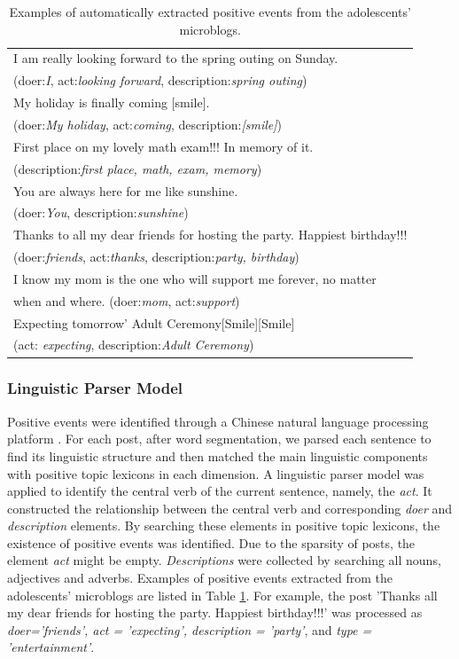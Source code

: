 \begin{table}[h]
\begin{center}
\caption{\small{Examples of automatically extracted positive events from the adolescents' microblogs.}}
\small{
\begin{tabular}{|l|} \hline
I am really looking forward to the spring outing on Sunday. \\
(doer:\emph{I}, act:\emph{looking forward}, description:\emph{spring outing})\\\hline
My holiday is finally coming [smile]. \\
(doer:\emph{My holiday}, act:\emph{coming}, description:\emph{[smile]})\\\hline
First place on my lovely math exam!!! In memory of it.\\
(description:\emph{first place, math, exam, memory})\\\hline
You are always here for me like sunshine. \\
(doer:\emph{You}, description:\emph{sunshine})\\\hline
Thanks to all my dear friends for hosting the party. 
Happiest birthday!!!\\
(doer:\emph{friends}, act:\emph{thanks}, description:\emph{party, birthday})\\\hline
I know my mom is the one who will support me forever, no matter \\
when and where. (doer:\emph{mom}, act:\emph{support})\\ \hline
Expecting tomorrow' Adult Ceremony[Smile][Smile]~~\\
(act: \emph{expecting}, description:\emph{Adult Ceremony})\\\hline 
\end{tabular}}
\label{tab:uplifts}
\end{center}
\end{table}

\subsubsection{Linguistic Parser Model} 
Positive events were identified through a Chinese natural language processing platform \citep{Che2010}.
For each post, after word segmentation, we parsed each sentence to find its linguistic structure 
and then matched the main linguistic components with positive topic lexicons in each dimension.
A linguistic parser model was applied to identify the central verb of the current sentence, namely, the \emph{act}. 
It constructed the relationship between the central verb and corresponding \emph{doer} and \emph{description} elements. 
By searching these elements in positive topic lexicons,
the existence of positive events was identified. 
Due to the sparsity of posts, the element \emph{act} might be empty.
\emph{Descriptions} were collected by searching all nouns, adjectives and adverbs.
Examples of positive events extracted from the adolescents' microblogs are listed in Table \ref{tab:uplifts}.
For example, the post 'Thanks all my dear friends for hosting the party. Happiest birthday!!!' 
was processed as \emph{doer='friends', act = 'expecting', description = 'party'}, 
and \emph{type = 'entertainment'}. 

